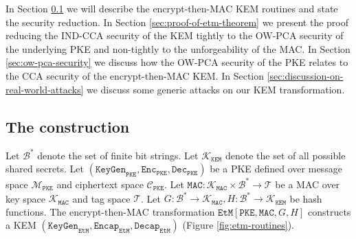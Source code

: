 \documentclass[runningheads]{llncs}
\newcommand{\pke}{\texttt{PKE}}
\newcommand{\keygen}{\texttt{KeyGen}}
\newcommand{\encrypt}{\texttt{Enc}}
\newcommand{\decrypt}{\texttt{Dec}}
\newcommand{\kem}{\texttt{KEM}}
\newcommand{\encap}{\texttt{Encap}}
\newcommand{\decap}{\texttt{Decap}}
\newcommand{\etm}{\texttt{EtM}}  %
\newcommand{\mac}{\texttt{MAC}}
\begin{document}
In Section \ref{sec:etm-construction} we will describe the encrypt-then-MAC KEM routines and state the security reduction. In Section \ref{sec:proof-of-etm-theorem} we present the proof reducing the IND-CCA security of the KEM tightly to the OW-PCA security of the underlying PKE and non-tightly to the unforgeability of the MAC. In Section \ref{sec:ow-pca-security} we discuss how the OW-PCA security of the PKE relates to the CCA security of the encrypt-then-MAC KEM. In Section \ref{sec:discussion-on-real-world-attacks} we discuss some generic attacks on our KEM transformation.

\subsection{The construction}\label{sec:etm-construction}
Let $\mathcal{B}^\ast$ denote the set of finite bit strings. Let $\mathcal{K}_\kem$ denote the set of all possible shared secrets. Let $(\keygen_\pke, \encrypt_\pke, \decrypt_\pke)$ be a PKE defined over message space $\mathcal{M}_\pke$ and ciphertext space $\mathcal{C}_\pke$. Let $\mac: \mathcal{K}_\mac \times \mathcal{B}^\ast \rightarrow \mathcal{T}$ be a MAC over key space $\mathcal{K}_\mac$ and tag space $\mathcal{T}$. Let $G: \mathcal{B}^\ast \rightarrow \mathcal{K}_\mac, H: \mathcal{B}^\ast \rightarrow \mathcal{K}_\kem$ be hash functions. The encrypt-then-MAC transformation $\etm[\pke,\mac,G,H]$ constructs a KEM $(\keygen_\etm, \encap_\etm, \decap_\etm)$ (Figure \ref{fig:etm-routines}).
\end{document}
